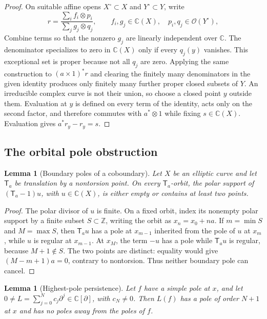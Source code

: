\documentclass[11pt]{article}
\numberwithin{equation}{section}
\newtheorem{lemma}[theorem]{Lemma}
\theoremstyle{definition}
\theoremstyle{remark}
\newcommand{\C}{\mathbb C}
\newcommand{\Z}{\mathbb Z}
\newcommand{\T}{\mathsf T}
\begin{document}
\begin{proof}
On suitable affine opens $X^\circ\subset X$ and $Y^\circ\subset Y$, write
\[
 r=\frac{\sum_i f_i\otimes p_i}{\sum_j g_j\otimes q_j},
 \qquad f_i,g_j\in\C(X),\quad p_i,q_j\in\mathcal O(Y^\circ),
\]
Combine terms so that the nonzero $g_j$ are linearly independent over
$\C$.  The denominator specializes to zero in $\C(X)$ only if every
$q_j(y)$ vanishes.  This exceptional set is proper because not all $q_j$
are zero.  Applying the same construction to $(a\times1)^*r$ and clearing
the finitely many denominators in the given identity produces only finitely
many further proper closed subsets of $Y$.  An irreducible complex curve is
not their union, so choose a closed point $y$ outside them.  Evaluation at
$y$ is defined on every term of the identity, acts only on the second
factor, and therefore commutes with $a^*\otimes1$ while fixing
$s\in\C(X)$.  Evaluation gives $a^*r_y-r_y=s$.
\end{proof}

\subsection{The orbital pole obstruction}

\begin{lemma}[Boundary poles of a coboundary]
\label{lem:boundary-poles}
Let $X$ be an elliptic curve and let $\T_a$ be translation by a nontorsion
point.  On every $\T_a$-orbit, the polar support of
$(\T_a-1)u$, with $u\in\C(X)$, is either empty or contains at least two
points.
\end{lemma}

\begin{proof}
The polar divisor of $u$ is finite.  On a fixed orbit, index its nonempty
polar support by a finite subset $S\subset\Z$, writing the orbit as
$x_n=x_0+na$.  If $m=\min S$ and $M=\max S$, then $\T_au$ has a pole at
$x_{m-1}$ inherited from the pole of $u$ at $x_m$, while $u$ is regular at
$x_{m-1}$.  At $x_M$, the term $-u$ has a pole while $\T_au$ is regular,
because $M+1\notin S$.  The two points are distinct: equality would give
$(M-m+1)a=0$, contrary to nontorsion.  Thus neither boundary pole can
cancel.
\end{proof}

\begin{lemma}[Highest-pole persistence]
\label{lem:highest-pole}
Let $f$ have a simple pole at $x$, and let
$0\neq L=\sum_{j=0}^Nc_j\partial^j\in\C[\partial]$, with $c_N\neq0$.
Then $L(f)$ has a pole of order $N+1$ at $x$ and has no poles away from the
poles of $f$.
\end{lemma}
\end{document}
